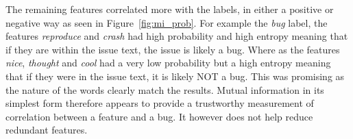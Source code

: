 The remaining features correlated more with the labels, in either a positive or negative way as seen in
Figure~\ref{fig:mi_prob}. For example the \textit{bug} label, the features \textit{reproduce} and \textit{crash} had high
probability and high entropy meaning that if they are within the issue text, the issue is likely a bug. Where as the features
\textit{nice}, \textit{thought} and \textit{cool} had a very low probability but a high entropy meaning that if they were in the
issue text, it is likely NOT a bug. This was promising as the nature of the words clearly match the results. Mutual information
in its simplest form therefore appears to provide a trustworthy measurement of correlation between a feature and a bug. It
however does not help reduce redundant features.

%
%
% 
% 
% 
% 
% 